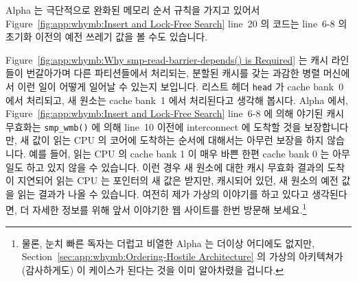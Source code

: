 Alpha 는 극단적으로 완화된 메모리 순서 규칙을 가지고 있어서
Figure~\ref{fig:app:whymb:Insert and Lock-Free Search} line~20 의
코드는 line~6-8 의 초기화 이전의 예전 쓰레기 값을 볼 수도 있습니다.

Figure~\ref{fig:app:whymb:Why smp-read-barrier-depends() is Required} 는 캐시
라인들이 번갈아가며 다른 파티션들에서 처리되는, 분할된 캐시를 갖는 과감한 병렬
머신에서 이런 일이 어떻게 일어날 수 있는지 보입니다.
리스트 헤더 {\tt head} 가 cache bank~0 에서 처리되고, 새 원소는 cache bank~1
에서 처리된다고 생각해 봅시다.
Alpha 에서, Figure~\ref{fig:app:whymb:Insert and Lock-Free Search} line~6-8 에
의해 야기된 캐시 무효화는 {\tt smp\_wmb()} 에 의해 line~10 이전에 interconnect
에 도착할 것을 보장합니다만, 새 값이 읽는 CPU 의 코어에 도착하는 순서에
대해서는 아무런 보장을 하지 않습니다.
예를 들어, 읽는 CPU 의 cache bank 1 이 매우 바쁜 한편 cache bank 0 는 아무 일도
하고 있지 않을 수 있습니다.
이런 경우 새 원소에 대한 캐시 무효화 결과의 도착이 지연되어 읽는 CPU 는
포인터의 새 값은 받지만, 캐시되어 있던, 새 원소의 예전 값을 읽는 결과가 나올 수
있습니다.
여전히 제가 가상의 이야기를 하고 있다고 생각된다면, 더 자세한 정보를 위해 앞서
이야기한 웹 사이트를 한번 방문해 보세요.\footnote{
	물론, 눈치 빠른 독자는 더럽고 비열한 Alpha 는 더이상 어디에도 없지만,
	Section~\ref{sec:app:whymb:Ordering-Hostile Architecture} 의 가상의
	아키텍쳐가 (감사하게도) 이 케이스가 된다는 것을 이미 알아차렸을
	겁니다.}

